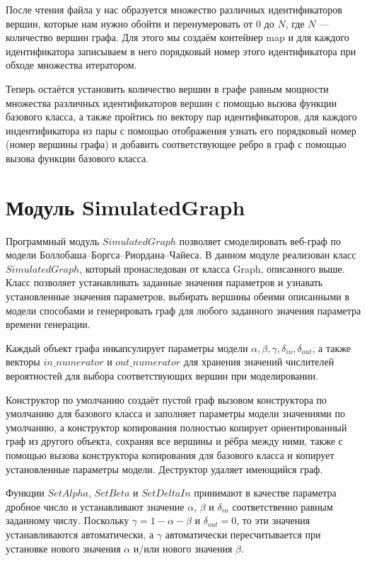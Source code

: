 \documentclass[14pt]{extreport}
\begin{document}
После чтения файла у нас образуется множество различных идентификаторов вершин, которые нам нужно обойти и перенумеровать от $0$ до $N$, где $N$ --- количество вершин графа. Для этого мы создаём контейнер map и для каждого идентификатора записываем в него порядковый номер этого идентификатора при обходе множества итератором.

Теперь остаётся установить количество вершин в графе равным мощности множества различных идентификаторов вершин с помощью вызова функции базового класса, а также пройтись по вектору пар идентификаторов, для каждого индентификатора из пары с помощью отображения узнать его порядковый номер (номер вершины графа) и добавить соответствующее ребро в граф с помощью вызова функции базового класса.

\section{Модуль SimulatedGraph}

Программный модуль $SimulatedGraph$ позволяет смоделировать веб-граф по модели Боллобаша--Боргса--Риордана--Чайеса. В данном модуле реализован класс $SimulatedGraph$, который пронаследован от класса Graph, описанного выше. Класс позволяет устанавливать заданные значения параметров и узнавать установленные значения параметров, выбирать вершины обеими описанными в модели способами и генерировать граф для любого заданного значения параметра времени генерации.

Каждый объект графа инкапсулирует параметры модели $\alpha, \beta, \gamma, \delta_{in}, \delta_{out}$, а также векторы $in\_numerator$ и $out\_numerator$ для хранения значений числителей вероятностей для выбора соответствующих вершин при моделировании.

Конструктор по умолчанию создаёт пустой граф вызовом конструктора по умолчанию для базового класса и заполняет параметры модели значениями по умолчанию, а конструктор копирования полностью копирует ориентированный граф из другого объекта, сохраняя все вершины и рёбра между ними, также с помощью вызова конструктора копирования для базового класса и копирует установленные параметры модели. Деструктор удаляет имеющийся граф.

Функции $SetAlpha$, $SetBeta$ и $SetDeltaIn$ принимают в качестве параметра дробное число и устанавливают значение $\alpha$, $\beta$ и $\delta_{in}$ соответственно равным заданному числу. Поскольку $\gamma = 1 - \alpha - \beta$ и $\delta_{out} = 0$, то эти значения устанавливаются автоматически, а $\gamma$ автоматически пересчитывается при установке нового значения $\alpha$ и/или нового значения $\beta$.
\end{document}
